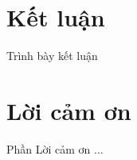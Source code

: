 \documentclass[12pt, a4paper]{article}
\begin{document}
\begin{multicols}{2}
\section{Kết luận}
Trình bày kết luận
\section{Lời cảm ơn}
Phần Lời cảm ơn ...




\end{multicols}
\end{document}
